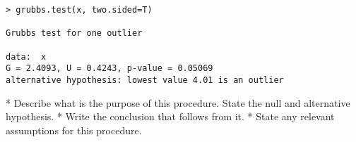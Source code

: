 \begin{framed}

\begin{verbatim}
> grubbs.test(x, two.sided=T)

Grubbs test for one outlier

data:  x
G = 2.4093, U = 0.4243, p-value = 0.05069
alternative hypothesis: lowest value 4.01 is an outlier
\end{verbatim}
\end{framed}

\begin{enumerate}[(i)]
*  Describe what is the purpose of this procedure. State the null and alternative hypothesis.
*  Write the conclusion that follows from it.
*  State any relevant assumptions for this procedure.
\end{enumerate}
